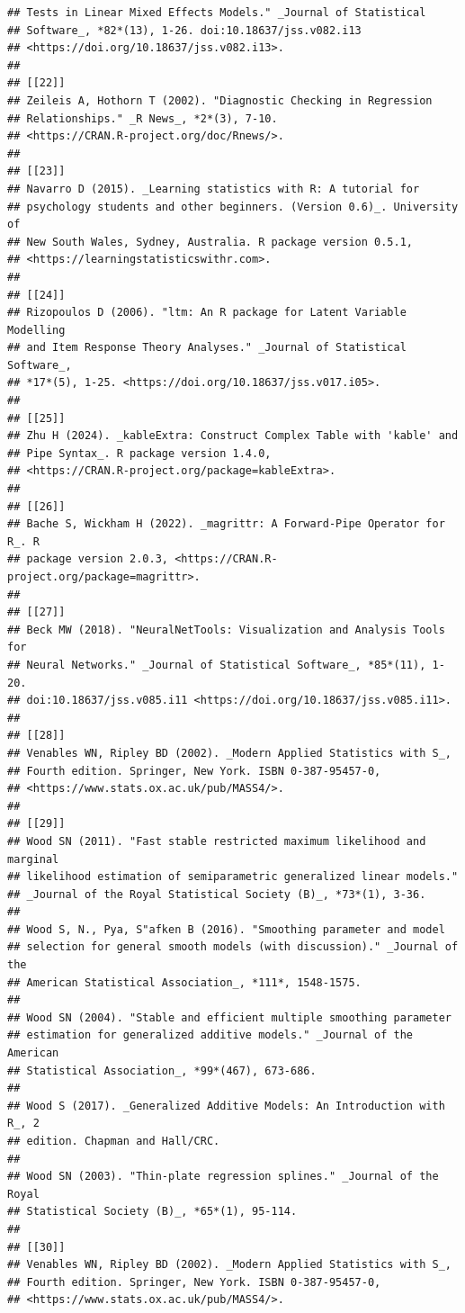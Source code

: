 \documentclass[a4paper, nobind]{templates/ociamthesis}
\begin{document}
\begin{verbatim}
## Tests in Linear Mixed Effects Models." _Journal of Statistical
## Software_, *82*(13), 1-26. doi:10.18637/jss.v082.i13
## <https://doi.org/10.18637/jss.v082.i13>.
## 
## [[22]]
## Zeileis A, Hothorn T (2002). "Diagnostic Checking in Regression
## Relationships." _R News_, *2*(3), 7-10.
## <https://CRAN.R-project.org/doc/Rnews/>.
## 
## [[23]]
## Navarro D (2015). _Learning statistics with R: A tutorial for
## psychology students and other beginners. (Version 0.6)_. University of
## New South Wales, Sydney, Australia. R package version 0.5.1,
## <https://learningstatisticswithr.com>.
## 
## [[24]]
## Rizopoulos D (2006). "ltm: An R package for Latent Variable Modelling
## and Item Response Theory Analyses." _Journal of Statistical Software_,
## *17*(5), 1-25. <https://doi.org/10.18637/jss.v017.i05>.
## 
## [[25]]
## Zhu H (2024). _kableExtra: Construct Complex Table with 'kable' and
## Pipe Syntax_. R package version 1.4.0,
## <https://CRAN.R-project.org/package=kableExtra>.
## 
## [[26]]
## Bache S, Wickham H (2022). _magrittr: A Forward-Pipe Operator for R_. R
## package version 2.0.3, <https://CRAN.R-project.org/package=magrittr>.
## 
## [[27]]
## Beck MW (2018). "NeuralNetTools: Visualization and Analysis Tools for
## Neural Networks." _Journal of Statistical Software_, *85*(11), 1-20.
## doi:10.18637/jss.v085.i11 <https://doi.org/10.18637/jss.v085.i11>.
## 
## [[28]]
## Venables WN, Ripley BD (2002). _Modern Applied Statistics with S_,
## Fourth edition. Springer, New York. ISBN 0-387-95457-0,
## <https://www.stats.ox.ac.uk/pub/MASS4/>.
## 
## [[29]]
## Wood SN (2011). "Fast stable restricted maximum likelihood and marginal
## likelihood estimation of semiparametric generalized linear models."
## _Journal of the Royal Statistical Society (B)_, *73*(1), 3-36.
## 
## Wood S, N., Pya, S"afken B (2016). "Smoothing parameter and model
## selection for general smooth models (with discussion)." _Journal of the
## American Statistical Association_, *111*, 1548-1575.
## 
## Wood SN (2004). "Stable and efficient multiple smoothing parameter
## estimation for generalized additive models." _Journal of the American
## Statistical Association_, *99*(467), 673-686.
## 
## Wood S (2017). _Generalized Additive Models: An Introduction with R_, 2
## edition. Chapman and Hall/CRC.
## 
## Wood SN (2003). "Thin-plate regression splines." _Journal of the Royal
## Statistical Society (B)_, *65*(1), 95-114.
## 
## [[30]]
## Venables WN, Ripley BD (2002). _Modern Applied Statistics with S_,
## Fourth edition. Springer, New York. ISBN 0-387-95457-0,
## <https://www.stats.ox.ac.uk/pub/MASS4/>.

\end{verbatim}
\end{document}
